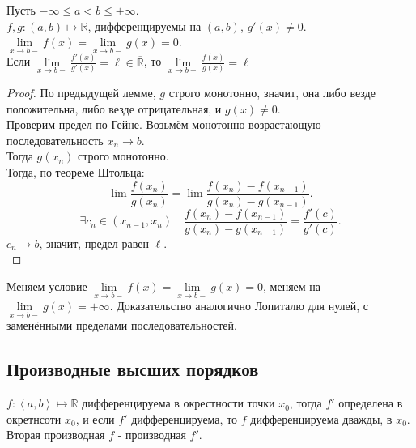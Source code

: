 \documentclass[11pt, oneside]{article}   	%
\begin{document}
            \begin{theorem}
                Пусть $-\infty \le a < b \le +\infty$.\\
                $f,g : \left( a, b \right) \mapsto \mathbb{R}$, дифференцируемы на $\left( a,b \right) $, $g'(x) \neq0$.\\
                $\lim\limits_{x \to b-} f(x) = \lim\limits_{x \to b-} g(x) = 0$.\\
                Если $\lim\limits_{x \to b-} \frac{f'(x)}{g'(x)} = \ell\in \overline{\mathbb{R}}$, то $\lim\limits_{x \to b-} \frac{f(x)}{g(x)} = \ell$
                \begin{proof}
                    По предыдущей лемме, $g$ строго монотонно, значит, она либо везде положительна, либо везде отрицательная, и $g(x) \neq 0$.\\
                    Проверим предел по Гейне. Возьмём монотонно возрастающую последовательность $x_n \to b$.\\
                    Тогда $g(x_n)$ строго монотонно.\\
                    Тогда, по теореме Штольца:
                    \[ \lim\frac{f(x_n)}{g(x_n)} = \lim \frac{f(x_{n}) - f(x_{n-1})}{g(x_n) - g(x_{n-1})} .\]
                    \[ \exists{c_n\in \left( x_{n-1}, x_n \right) }\quad \frac{f(x_n) - f(x_{n-1})}{g(x_n) - g(x_{n-1})} = \frac{f'(c)}{g'(c)} .\]
                    $c_n \to b$, значит, предел равен $\ell$.\\
                \end{proof}
            \end{theorem}
            \begin{theorem}
                Меняем условие $\lim\limits_{x \to b-} f(x) = \lim\limits_{x \to b-} g(x) = 0$, меняем на $\lim\limits_{x \to b-} g(x) = +\infty$. Доказательство аналогично Лопиталю для нулей, с заменёнными пределами последовательностей.
            \end{theorem}
    \subsection{Производные высших порядков}
        \begin{definition}
            $f: \left<a, b\right> \mapsto \mathbb{R}$ дифференцируема в окрестности точки $x_0$, тогда $f'$ определена в окретнсоти $x_0$, и если $f'$ дифференцируема, то  $f$ дифференцируема дважды, в  $x_0$.\\ 
            Вторая производная $f$ - производная $f'$.
        \end{definition}
\end{document}
